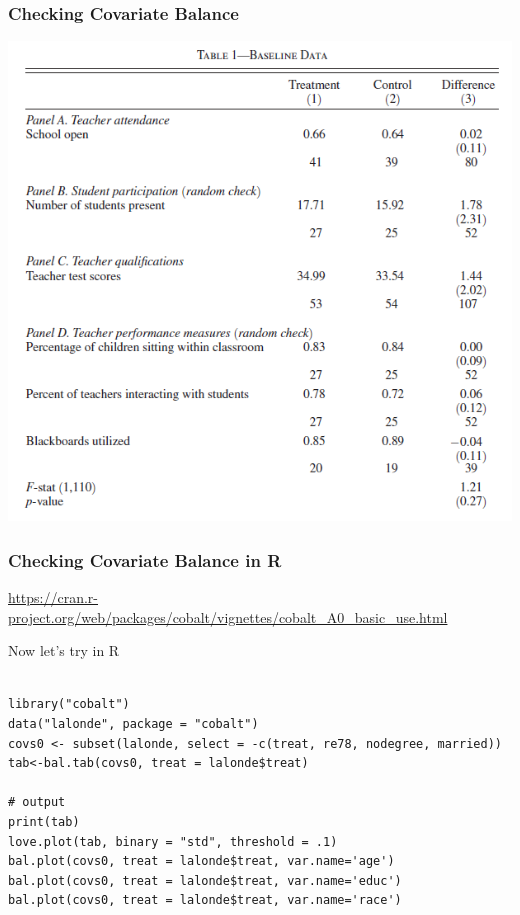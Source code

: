 \documentclass[xcolor=pdftex,dvipsnames,table,mathserif,aspectratio=169]{beamer}
\begin{document}
\begin{frame}
\frametitle{Checking Covariate Balance}
\begin{center}
\includegraphics[height=0.9\textheight]{./resources/duflo-balance-table.png}
\end{center}
\end{frame}

\begin{frame}\frametitle{Checking Covariate Balance in R}
\url{https://cran.r-project.org/web/packages/cobalt/vignettes/cobalt_A0_basic_use.html}
\end{frame}

\begin{frame}[fragile]{Now let's try in R}
  \begin{center}
    \begin{minipage}{0.8\textwidth}
      \begin{verbatim}

library("cobalt")
data("lalonde", package = "cobalt") 
covs0 <- subset(lalonde, select = -c(treat, re78, nodegree, married))
tab<-bal.tab(covs0, treat = lalonde$treat)

# output
print(tab)
love.plot(tab, binary = "std", threshold = .1)
bal.plot(covs0, treat = lalonde$treat, var.name='age')
bal.plot(covs0, treat = lalonde$treat, var.name='educ')
bal.plot(covs0, treat = lalonde$treat, var.name='race')
      \end{verbatim}
    \end{minipage}
  \end{center} 
\end{frame}
\end{document}
